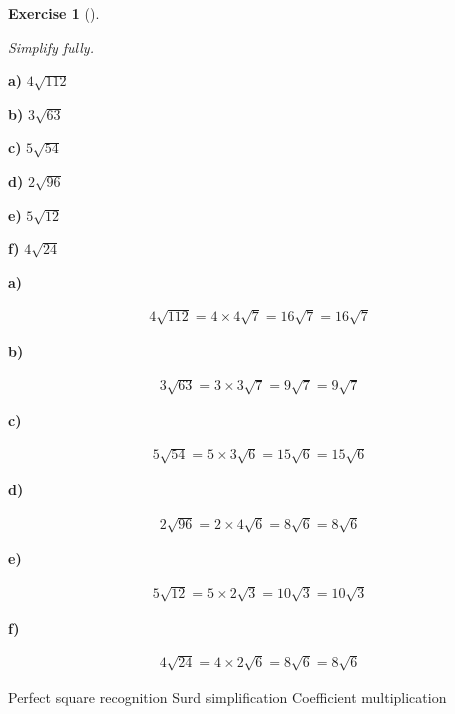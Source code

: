 \documentclass[
  letterpaper,
  DIV=11,
  numbers=noendperiod]{scrreprt}
\theoremstyle{definition}
\newtheorem{exercise}{Exercise}[chapter]
\theoremstyle{remark}
\begin{document}
\begin{exercise}[]\protect\hypertarget{exr-u2-41}{}\label{exr-u2-41}

\emph{Simplify fully.}

\textbf{a)} \(\displaystyle 4\sqrt{112}\)

\textbf{b)} \(\displaystyle 3\sqrt{63}\)

\textbf{c)} \(\displaystyle 5\sqrt{54}\)

\textbf{d)} \(\displaystyle 2\sqrt{96}\)

\textbf{e)} \(\displaystyle 5\sqrt{12}\)

\textbf{f)} \(\displaystyle 4\sqrt{24}\)

\begin{tcolorbox}[enhanced jigsaw, opacitybacktitle=0.6, coltitle=black, arc=.35mm, colframe=quarto-callout-tip-color-frame, colback=white, bottomrule=.15mm, left=2mm, colbacktitle=quarto-callout-tip-color!10!white, titlerule=0mm, opacityback=0, title=\textcolor{quarto-callout-tip-color}{\faLightbulb}\hspace{0.5em}{🔍 View Solutions}, leftrule=.75mm, breakable, rightrule=.15mm, bottomtitle=1mm, toptitle=1mm, toprule=.15mm]

\textbf{a)}

\[
\begin{aligned}
4\sqrt{112}=4\times 4\sqrt{7}=16\sqrt{7}=16\sqrt{7}
\end{aligned}
\]

\textbf{b)}

\[
\begin{aligned}
3\sqrt{63}=3\times 3\sqrt{7}=9\sqrt{7}=9\sqrt{7}
\end{aligned}
\]

\textbf{c)}

\[
\begin{aligned}
5\sqrt{54}=5\times 3\sqrt{6}=15\sqrt{6}=15\sqrt{6}
\end{aligned}
\]

\textbf{d)}

\[
\begin{aligned}
2\sqrt{96}=2\times 4\sqrt{6}=8\sqrt{6}=8\sqrt{6}
\end{aligned}
\]

\textbf{e)}

\[
\begin{aligned}
5\sqrt{12}=5\times 2\sqrt{3}=10\sqrt{3}=10\sqrt{3}
\end{aligned}
\]

\textbf{f)}

\[
\begin{aligned}
4\sqrt{24}=4\times 2\sqrt{6}=8\sqrt{6}=8\sqrt{6}
\end{aligned}
\]

\end{tcolorbox}

{Perfect square recognition} {Surd simplification} {Coefficient
multiplication}

\end{exercise}
\end{document}
